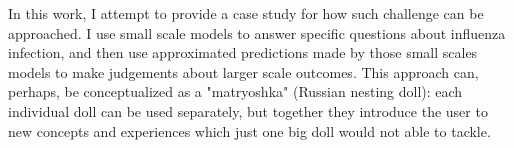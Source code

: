 In this work, I attempt to provide a case study for how such challenge can be approached. I use small scale models to answer specific questions about influenza infection, and then use approximated predictions made by those small scales models to make judgements about larger scale outcomes. This approach can, perhaps, be conceptualized as a "matryoshka" (Russian nesting doll): each individual doll can be used separately, but together they introduce the user to new concepts and experiences which just one big doll would not able to tackle.

















%
